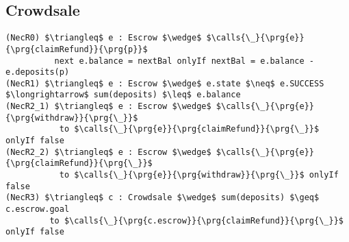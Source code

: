 \subsection{Crowdsale}
\label{ss:Crowdsale}
\begin{lstlisting}[mathescape=true, language=chainmail]
(NecR0) $\triangleq$ e : Escrow $\wedge$ $\calls{\_}{\prg{e}}{\prg{claimRefund}}{\prg{p}}$
          next e.balance = nextBal onlyIf nextBal = e.balance - e.deposits(p)
(NecR1) $\triangleq$ e : Escrow $\wedge$ e.state $\neq$ e.SUCCESS $\longrightarrow$ sum(deposits) $\leq$ e.balance
(NecR2_1) $\triangleq$ e : Escrow $\wedge$ $\calls{\_}{\prg{e}}{\prg{withdraw}}{\prg{\_}}$
           to $\calls{\_}{\prg{e}}{\prg{claimRefund}}{\prg{\_}}$ onlyIf false
(NecR2_2) $\triangleq$ e : Escrow $\wedge$ $\calls{\_}{\prg{e}}{\prg{claimRefund}}{\prg{\_}}$
           to $\calls{\_}{\prg{e}}{\prg{withdraw}}{\prg{\_}}$ onlyIf false
(NecR3) $\triangleq$ c : Crowdsale $\wedge$ sum(deposits) $\geq$ c.escrow.goal
         to $\calls{\_}{\prg{c.escrow}}{\prg{claimRefund}}{\prg{\_}}$ onlyIf false
\end{lstlisting}


 

